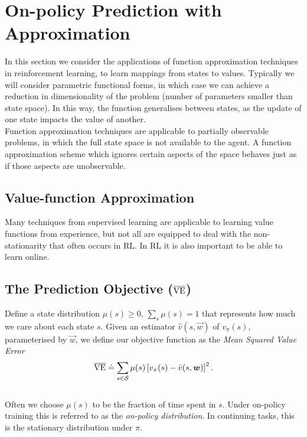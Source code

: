 \section{On-policy Prediction with Approximation}

In this section we consider the applications of function approximation techniques in reinforcement learning, to learn mappings from states to values. Typically we will consider parametric functional forms, in which case we can achieve a reduction in dimensionality of the problem (number of parameters smaller than state space). In this way, the function generalises between states, as the update of one state impacts the value of another.\\

Function approximation techniques are applicable to partially observable problems, in which the full state space is not available to the agent. A function approximation scheme which ignores certain aspects of the space behaves just as if those aspects are unobservable.

\subsection{Value-function Approximation}
Many techniques from supervised learning are applicable to learning value functions from experience, but not all are equipped to deal with the non-stationarity that often occurs in RL. In RL it is also important to be able to learn online.\\

\subsection{The Prediction Objective ($\overline{\mathrm{VE}}{}$)}
Define a state distribution $\mu(s) \geq 0$, $\sum_s \mu(s) = 1$ that represents how much we care about each state $s$. Given an estimator $\hat{v}(s, \vec{w})$ of $v_\pi(s)$, parameterised by $\vec{w}$, we define our objective function as the \emph{Mean Squared Value Error}
\begin{equation}
    \overline{\mathrm{VE}}{} \doteq \sum_{s \in \mathcal{S}{}} \mu(s) \left[ v_\pi(s) - \hat{v}(s, \boldsymbol{w})\right]^2.
\end{equation}\\

Often we choose $\mu(s)$ to be the fraction of time spent in $s$. Under on-policy training this is referred to as the \emph{on-policy distribution}. In continuing tasks, this is the stationary distribution under $\pi$.\\

